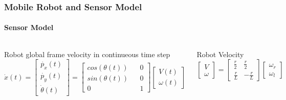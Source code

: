 \begin{frame}
	\frametitle{Mobile Robot and Sensor Model}
	\framesubtitle{Sensor Model}
	\footnotesize
	\begin{columns}
	\begin{block}{\footnotesize Robot global frame velocity in continueous time step}
		\begin{equation}
			\dot{x}(t)=
			\begin{bmatrix}
				\dot{p_x}(t) \\
				\dot{p_y}(t) \\
				\dot{\theta}(t)
			\end{bmatrix} = 
			\begin{bmatrix}
				cos(\theta(t)) && 0\\
				sin(\theta(t)) && 0\\
				0 && 1
			\end{bmatrix}
			\begin{bmatrix}
				V(t)\\
				\omega(t)
			\end{bmatrix}
		\end{equation}
	\end{block}

	\begin{block}{\footnotesize Robot Velocity}
		\begin{equation}
			\begin{bmatrix}
				V\\
				\omega
			\end{bmatrix}=\begin{bmatrix}
				\frac{r}{2} & \frac{r}{2}\\
				\frac{r}{L} & -\frac{r}{L}
			\end{bmatrix}\begin{bmatrix}
				\omega_r\\
				\omega_l
			\end{bmatrix}
		\end{equation}
	\end{block}


\end{columns}
\end{frame}
